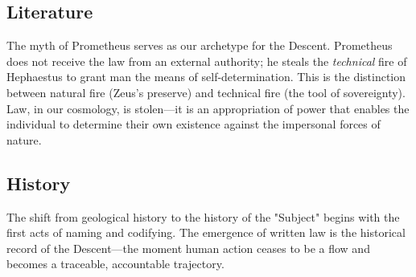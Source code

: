 \subsection{Literature}
The myth of Prometheus serves as our archetype for the Descent. Prometheus does not receive the law from an external authority; he steals the \textit{technical} fire of Hephaestus to grant man the means of self-determination. This is the distinction between natural fire (Zeus's preserve) and technical fire (the tool of sovereignty). Law, in our cosmology, is stolen—it is an appropriation of power that enables the individual to determine their own existence against the impersonal forces of nature.

\subsection{History}
The shift from geological history to the history of the "Subject" begins with the first acts of naming and codifying. The emergence of written law is the historical record of the Descent—the moment human action ceases to be a flow and becomes a traceable, accountable trajectory.
